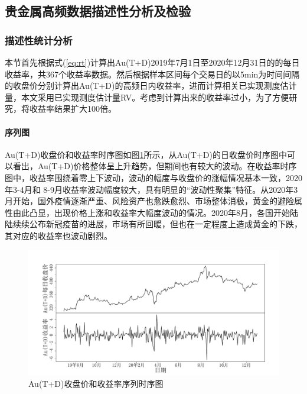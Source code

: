 \documentclass[UTF8,a4paper,12pt]{ctexart}  %
\begin{document}
\hypertarget{section-9}{%
\subsection{贵金属高频数据描述性分析及检验}\label{section-9}}

\hypertarget{section-10}{%
\subsubsection{描述性统计分析}\label{section-10}}

本节首先根据式(\ref{eq:rt})计算出Au(T+D)2019年7月1日至2020年12月31日的的每日收益率，共367个收益率数据。然后根据样本区间每个交易日的以5min为时间间隔的收盘价分别计算出Au(T+D)的高频日内收益率，进而计算相关已实现测度估计量，本文采用已实现测度估计量RV。考虑到计算出来的收益率过小，为了方便研究，将收益率结果扩大100倍。

\hypertarget{section-11}{%
\paragraph{序列图}\label{section-11}}

Au(T+D)收盘价和收益率时序图如图\ref{fig:Aurtplot}所示，从Au(T+D)的日收盘价时序图中可以看出，Au(T+D)价格整体呈上升趋势，但期间也有较大的波动。在收益率时序图中，收益率围绕着零上下波动，波动的幅度与收盘价的涨幅情况基本一致，2020年3-4月和
8-9月收益率波动幅度较大，具有明显的``波动性聚集''特征。从2020年3月开始，国外疫情逐渐严重、风险资产也愈跌愈烈、市场整体消极，黄金的避险属性由此凸显，出现价格上涨和收益率大幅度波动的情况。2020年8月，各国开始陆陆续续公布新冠疫苗的进展，市场有所回暖，但也在一定程度上造成黄金的下跌，其对应的收益率也波动剧烈。

\begin{figure}[H]

{\centering \includegraphics[width=0.95\linewidth]{03-estimation-lytfinal_files/figure-latex/Aurtplot-1} 

}

\caption{Au(T+D)收盘价和收益率序列时序图}\label{fig:Aurtplot}
\end{figure}
\end{document}
